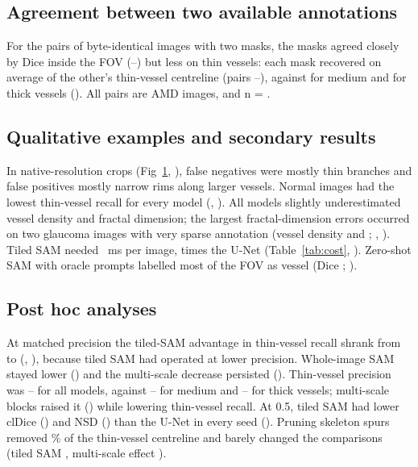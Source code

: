 \subsection*{Agreement between two available annotations}
For the \AgreeNPairs{} pairs of byte-identical images with two masks, the masks agreed closely by Dice inside the FOV
(\AgreeDiceMin--\AgreeDiceMax) but less on thin vessels: each mask recovered on average \AgreeThinMean{} of the other's
thin-vessel centreline (pairs \AgreeThinMin--\AgreeThinMax), against \AgreeMedMean{} for medium and \AgreeThickMean{} for
thick vessels (). All pairs are AMD images, and n = \AgreeNPairs.

\subsection*{Qualitative examples and secondary results}
In native-resolution crops (Fig~\ref{fig:qualitative}, ), false negatives were mostly thin branches and
false positives mostly narrow rims along larger vessels. Normal images had the lowest thin-vessel recall for every model (, ). All models slightly underestimated vessel
density and fractal dimension; the largest fractal-dimension errors occurred on two glaucoma images with very sparse
annotation (vessel density \FDOutOneDens{} and \FDOutTwoDens; , ). Tiled SAM
needed \SAMTiledInfMs{}~ms per image, \SAMTiledInfRatio{} times the U-Net (Table~\ref{tab:cost}, ).
Zero-shot SAM with oracle prompts labelled most of the FOV as vessel (Dice \OracleDice; ).

\begin{figure}[!h]
\caption{\CapQualitative}
\label{fig:qualitative}
\end{figure}



\subsection*{Post hoc analyses}
At matched precision the tiled-SAM advantage in thin-vessel recall shrank from \SAMTiledThinDiff{} to
\PHStTiledThinMatch{} (, ), because tiled SAM had operated at lower precision. Whole-image SAM stayed lower (\PHStWholeThinMatch) and the multi-scale decrease persisted
(\PHStMSThinMatch). Thin-vessel precision was \PHWPrecThinMin--\PHWPrecThinMax{} for all models, against
\PHWPrecMedMin--\PHWPrecMedMax{} for medium and \PHWPrecThickMin--\PHWPrecThickMax{} for thick vessels; multi-scale blocks
raised it (\PHStMSWPrecSel) while lowering thin-vessel recall. At 0.5, tiled SAM had lower clDice (\PHStTiledClDiceFix)
and NSD (\PHStTiledNSDFix) than the U-Net in every seed (). Pruning skeleton spurs removed
\PHPrunedThinShare\% of the thin-vessel centreline and barely changed the comparisons (tiled SAM \PHStTiledThinPrSel,
multi-scale effect \PHStMSThinPrSel).

